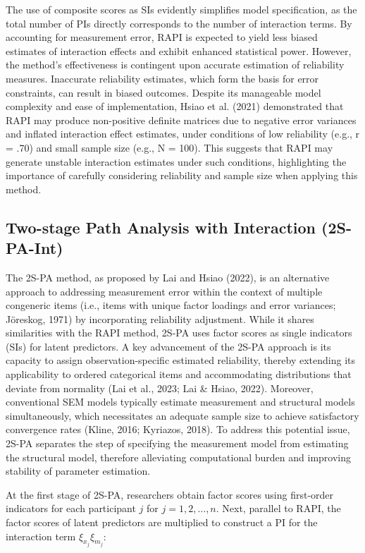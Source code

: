\documentclass[
  man]{apa6}
\begin{document}
The use of composite scores as SIs evidently simplifies model specification, as the total number of PIs directly corresponds to the number of interaction terms. By accounting for measurement error, RAPI is expected to yield less biased estimates of interaction effects and exhibit enhanced statistical power. However, the method's effectiveness is contingent upon accurate estimation of reliability measures. Inaccurate reliability estimates, which form the basis for error constraints, can result in biased outcomes. Despite its manageable model complexity and ease of implementation, Hsiao et al. (2021) demonstrated that RAPI may produce non-positive definite matrices due to negative error variances and inflated interaction effect estimates, under conditions of low reliability (e.g., r = .70) and small sample size (e.g., N = 100). This suggests that RAPI may generate unstable interaction estimates under such conditions, highlighting the importance of carefully considering reliability and sample size when applying this method.

\subsection{Two-stage Path Analysis with Interaction (2S-PA-Int)}\label{two-stage-path-analysis-with-interaction-2s-pa-int}

The 2S-PA method, as proposed by Lai and Hsiao (2022), is an alternative approach to addressing measurement error within the context of multiple congeneric items (i.e., items with unique factor loadings and error variances; Jöreskog, 1971) by incorporating reliability adjustment. While it shares similarities with the RAPI method, 2S-PA uses factor scores as single indicators (SIs) for latent predictors. A key advancement of the 2S-PA approach is its capacity to assign observation-specific estimated reliability, thereby extending its applicability to ordered categorical items and accommodating distributions that deviate from normality (Lai et al., 2023; Lai \& Hsiao, 2022). Moreover, conventional SEM models typically estimate measurement and structural models simultaneously, which necessitates an adequate sample size to achieve satisfactory convergence rates (Kline, 2016; Kyriazos, 2018). To address this potential issue, 2S-PA separates the step of specifying the measurement model from estimating the structural model, therefore alleviating computational burden and improving stability of parameter estimation.

At the first stage of 2S-PA, researchers obtain factor scores using first-order indicators for each participant \(j\) for \(j = 1, 2, ..., n\). Next, parallel to RAPI, the factor scores of latent predictors are multiplied to construct a PI for the interaction term \(\xi_{x_{j}}\xi_{m_{j}}\):
\end{document}
